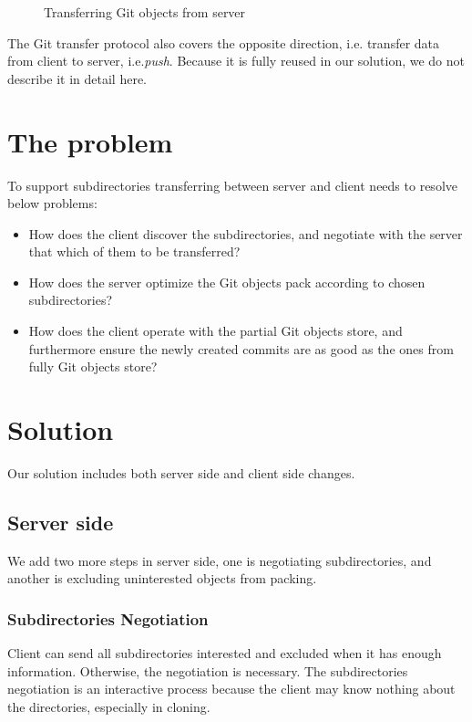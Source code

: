 \documentclass[preprint]{sigplanconf}
\begin{document}
\begin{figure}[htpb]
  \centering
  
  \caption{Transferring Git objects from server}
  \label{fig:git-proto-clone-seq}
\end{figure}
The Git transfer protocol also covers the opposite direction, i.e. transfer
data from client to server, i.e.\emph{push}.
Because it is fully reused in our solution, we do not describe it in detail
here.

\section{The problem}
To support subdirectories transferring between server and client needs to
resolve below problems:
\begin{itemize}
  \item How does the client discover the subdirectories, and negotiate with
      the server that which of them to be transferred?

  \item How does the server optimize the Git objects pack according to chosen
      subdirectories?

  \item How does the client operate with the partial Git objects store, and
      furthermore ensure the newly created commits are as good as the ones
      from fully Git objects store?
\end{itemize}

\section{Solution}
Our solution includes both server side and client side changes.
\subsection{Server side}
We add two more steps in server side, one is negotiating subdirectories,
and another is excluding uninterested objects from packing.
\subsubsection{Subdirectories Negotiation}
Client can send all subdirectories interested and excluded when it has enough
information.
Otherwise, the negotiation is necessary.
The subdirectories negotiation is an interactive process because the client may
know nothing about the directories, especially in cloning.
\end{document}
